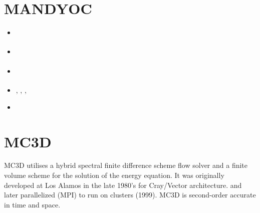 
\section{MANDYOC}

\begin{small}
\begin{itemize}
\item[\twothousandnine]        \textcite{saus09}
\item[\twothousandseventeen]   \textcite{sace17}
\item[\twothousandtwentyone]   \textcite{sasa21}
\item[\twothousandtwentytwo]   \textcite{saap22}, \textcite{sisa22}, 
                               \textcite{saap22}, \textcite{saup22}
\item[\twothousandtwentythree] \textcite{sisd23}
\end{itemize}
\end{small} 

\section{MC3D}

MC3D utilises a hybrid spectral finite difference scheme flow
solver and a finite volume scheme for the solution of the energy equation.
It was originally developed at Los Alamos in the late 1980's for Cray/Vector architecture. 
and later parallelized (MPI) to run on clusters (1999).
MC3D is second-order accurate in time and space.


